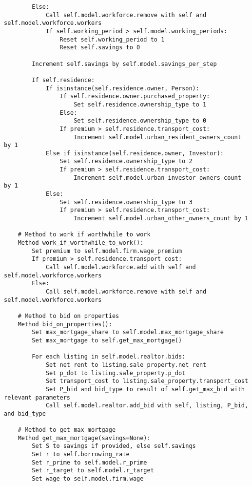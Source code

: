 {\begin{verbatim}
        Else:
            Call self.model.workforce.remove with self and self.model.workforce.workers
            If self.working_period > self.model.working_periods:
                Reset self.working_period to 1
                Reset self.savings to 0

        Increment self.savings by self.model.savings_per_step

        If self.residence:
            If isinstance(self.residence.owner, Person):
                If self.residence.owner.purchased_property:
                    Set self.residence.ownership_type to 1
                Else:
                    Set self.residence.ownership_type to 0
                If premium > self.residence.transport_cost:
                    Increment self.model.urban_resident_owners_count by 1
            Else if isinstance(self.residence.owner, Investor):
                Set self.residence.ownership_type to 2
                If premium > self.residence.transport_cost:
                    Increment self.model.urban_investor_owners_count by 1
            Else:
                Set self.residence.ownership_type to 3
                If premium > self.residence.transport_cost:
                    Increment self.model.urban_other_owners_count by 1

    # Method to work if worthwhile to work
    Method work_if_worthwhile_to_work():
        Set premium to self.model.firm.wage_premium
        If premium > self.residence.transport_cost:
            Call self.model.workforce.add with self and self.model.workforce.workers
        Else:
            Call self.model.workforce.remove with self and self.model.workforce.workers

    # Method to bid on properties
    Method bid_on_properties():
        Set max_mortgage_share to self.model.max_mortgage_share
        Set max_mortgage to self.get_max_mortgage()

        For each listing in self.model.realtor.bids:
            Set net_rent to listing.sale_property.net_rent
            Set p_dot to listing.sale_property.p_dot
            Set transport_cost to listing.sale_property.transport_cost
            Set P_bid and bid_type to result of self.get_max_bid with relevant parameters
            Call self.model.realtor.add_bid with self, listing, P_bid, and bid_type

    # Method to get max mortgage
    Method get_max_mortgage(savings=None):
        Set S to savings if provided, else self.savings
        Set r to self.borrowing_rate
        Set r_prime to self.model.r_prime
        Set r_target to self.model.r_target
        Set wage to self.model.firm.wage


\end{verbatim}}
